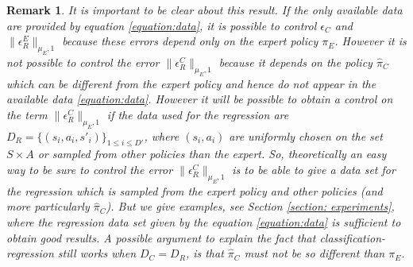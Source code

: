 \documentclass[11pt]{article}
\newtheorem{remark}{Remark}
\newcommand{\0}{\mathbf{0}}
\newcommand{\1}{\mathbf{1}}
\begin{document}
\begin{remark}
It is important to be clear about this result. If the only available data are provided by equation \eqref{equation:data}, it is possible to control
$\epsilon_C$ and $\|\epsilon^E_R\|_{\mu_E,1}$ because these errors depend only on the expert policy $\pi_E$. However it is not possible to control the error $\|\epsilon^C_R\|_{\mu_E,1}$
because it depends on the policy $\hat{\pi}_C$ which can be different from the expert policy and hence do not appear in the available data \eqref{equation:data}. However
it will be possible to obtain a control on the term $\|\epsilon^C_R\|_{\mu_E,1}$ if the data used for the regression are $D_R=\{(s_i,a_i,s'_i)\}_{1\leq i \leq D'}$, where $(s_{i},a_{i})$ are uniformly chosen on the set $S\times A$ or sampled from other policies than the expert. So, theoretically an easy way to be sure
to control the error $\|\epsilon^C_R\|_{\mu_E,1}$ is to be able to give a data set for the regression which is sampled from the expert policy and other policies (and more particularly $\hat{\pi}_C$). But we give examples, see Section \ref{section: experiments}, where the regression data set given by the equation \eqref{equation:data} is sufficient to obtain good results.
A possible argument to explain the fact that classification-regression still works when $D_C=D_R$, is that $\hat{\pi}_C$ must not be so different than $\pi_E$. 
\end{remark}
\end{document}
